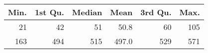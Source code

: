 \begin{figure} 
\begin{tabular}{rrrrrr}
 Min. & 1st Qu. & Median & Mean & 3rd Qu. & Max. \\ 
  \hline
\hline
21 & 42 & 51 & 50.8 & 60 & 105 \\ 
  163 & 494 & 515 & 497.0 & 529 & 571 \\ 
  \end{tabular}
\label{}
\end{figure} 
